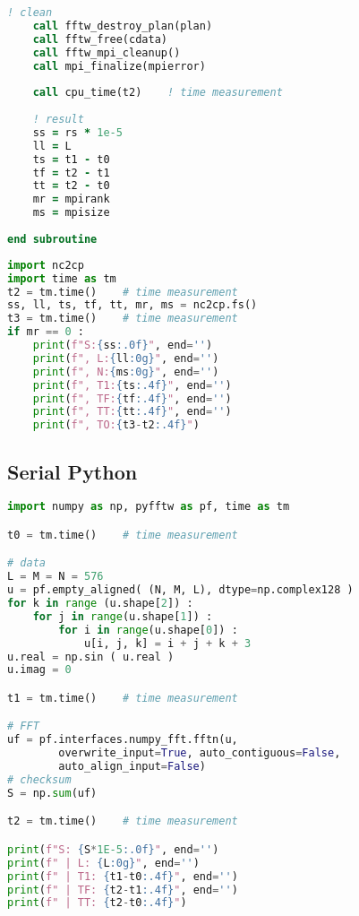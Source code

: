 \begin{lstlisting}[language=Fortran, caption={Parallel F2PY implementation of the FFT test case - F90 module code.}]
    ! clean
    call fftw_destroy_plan(plan)
    call fftw_free(cdata)
    call fftw_mpi_cleanup()
    call mpi_finalize(mpierror)
       
    call cpu_time(t2)    ! time measurement        
    
    ! result
    ss = rs * 1e-5
    ll = L
    ts = t1 - t0
    tf = t2 - t1   
    tt = t2 - t0
    mr = mpirank
    ms = mpisize
    
end subroutine
\end{lstlisting}




\begin{lstlisting}[language=Python, caption={Parallel F2PY implementation of the FFT test case - Python main code.}]
import nc2cp
import time as tm
t2 = tm.time()    # time measurement
ss, ll, ts, tf, tt, mr, ms = nc2cp.fs()
t3 = tm.time()    # time measurement
if mr == 0 :
    print(f"S:{ss:.0f}", end='')
    print(f", L:{ll:0g}", end='')
    print(f", N:{ms:0g}", end='')
    print(f", T1:{ts:.4f}", end='')
    print(f", TF:{tf:.4f}", end='')
    print(f", TT:{tt:.4f}", end='')
    print(f", TO:{t3-t2:.4f}")
\end{lstlisting}




\subsection{Serial Python}
\begin{lstlisting}[language=Python, caption={Serial Python implementation of the FFT test case.}]
import numpy as np, pyfftw as pf, time as tm

t0 = tm.time()    # time measurement

# data
L = M = N = 576
u = pf.empty_aligned( (N, M, L), dtype=np.complex128 )
for k in range (u.shape[2]) :
    for j in range(u.shape[1]) :
        for i in range(u.shape[0]) :
            u[i, j, k] = i + j + k + 3
u.real = np.sin ( u.real )
u.imag = 0

t1 = tm.time()    # time measurement

# FFT
uf = pf.interfaces.numpy_fft.fftn(u,
        overwrite_input=True, auto_contiguous=False,
        auto_align_input=False)
# checksum
S = np.sum(uf)

t2 = tm.time()    # time measurement

print(f"S: {S*1E-5:.0f}", end='')
print(f" | L: {L:0g}", end='')
print(f" | T1: {t1-t0:.4f}", end='')
print(f" | TF: {t2-t1:.4f}", end='')
print(f" | TT: {t2-t0:.4f}")
\end{lstlisting}




